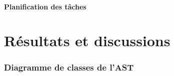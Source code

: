 \documentclass[a4paper]{article}%
\begin{document}
\subsection{Planification des tâches}


\part{Résultats et discussions}

\clearpage{}
\printbibliography[keyword={paper},title={Biliographie}]
\printbibliography[keyword={web},title={Webographie}]

\clearpage
\printglossaries

\appendix

\clearpage{}
\section{Diagramme de classes de l'AST}\label{appendix:classAST}

\begin{figure}[h]
  \begin{center}
  \end{center}
\end{figure}
\end{document}
